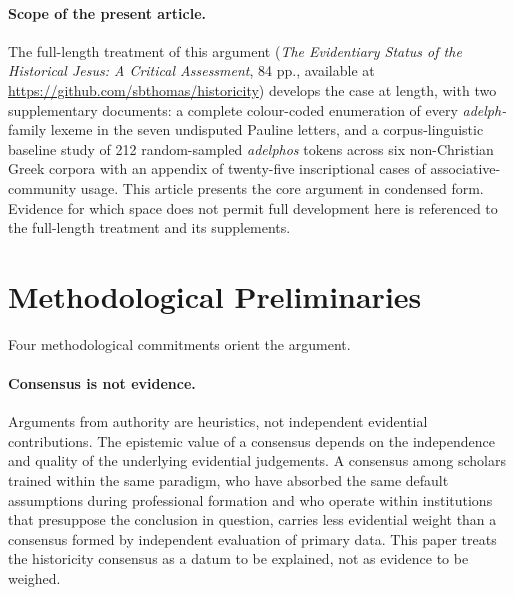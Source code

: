 \documentclass[12pt,oneside]{article}
\begin{document}
\paragraph{Scope of the present article.}
The full-length treatment of this argument (\textit{The Evidentiary
Status of the Historical Jesus: A Critical Assessment}, 84 pp.,
available at \url{https://github.com/sbthomas/historicity}) develops
the case at length, with two supplementary documents: a complete
colour-coded enumeration of every \textit{adelph-} family lexeme in
the seven undisputed Pauline letters, and a corpus-linguistic
baseline study of 212 random-sampled \textit{adelphos} tokens across
six non-Christian Greek corpora with an appendix of twenty-five
inscriptional cases of associative-community usage.  This article
presents the core argument in condensed form.  Evidence for which
space does not permit full development here is referenced to the
full-length treatment and its supplements.

\section{Methodological Preliminaries}

Four methodological commitments orient the argument.

\paragraph{Consensus is not evidence.}
Arguments from authority are heuristics, not independent evidential
contributions.  The epistemic value of a consensus depends on the
independence and quality of the underlying evidential judgements.
A consensus among scholars trained within the same paradigm, who
have absorbed the same default assumptions during professional
formation and who operate within institutions that presuppose the
conclusion in question, carries less evidential weight than a
consensus formed by independent evaluation of primary data.  This
paper treats the historicity consensus as a datum to be explained,
not as evidence to be weighed.
\end{document}
